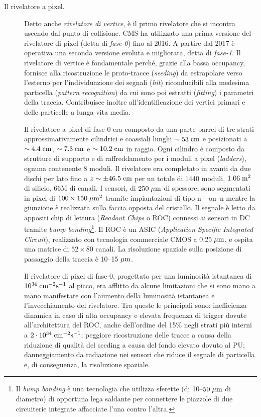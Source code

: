 \begin{description}

\item[Il rivelatore a pixel.] Detto anche {\em rivelatore di vertice}, \`e il primo rivelatore che si incontra uscendo dal punto di collisione. CMS ha utilizzato una prima versione del rivelatore di pixel (detta di {\em fase-0}) fino al 2016. A partire dal 2017 \`e operativa una seconda versione evoluta e migliorata, detta di {\em fase-1}. Il rivelatore di vertice \`e fondamentale perch\'e, grazie alla bassa occupancy, fornisce alla ricostruzione le proto-tracce ({\em seeding}) da estrapolare verso l'esterno per l'individuazione dei segnali ({\em hit}) riconducibili alla medesima particella ({\em pattern recognition}) da cui sono poi estratti ({\em fitting}) i parametri della traccia\cite{Chatrchyan:2014fea}. Contribuisce inoltre all'identificazione dei vertici primari e delle particelle a lunga vita media.
 
Il rivelatore a pixel di fase-0 era composto da una parte barrel di tre strati approssimativamente cilindrici e coassiali lunghi $\sim 53\rm \; cm$ e posizionati a $\sim 4.4\rm \; cm$, $\sim 7.3\rm \; cm$ e $\sim 10.2\rm \; cm$ in raggio. Ogni cilindro \`e composto da strutture di supporto e di raffreddamento per i moduli a pixel ({\em ladders}), ognuna contenente 8 moduli. Il rivelatore era completato in avanti da due dischi per lato fino a $z\sim\pm 46.5\rm \; cm$ per un totale di 1440 moduli, $1.06\rm \; m^2$ di silicio, 66M di canali. I sensori, di $250\; \mu \rm m$ di spessore, sono segmentati in pixel di $100\times150\; \mu \rm m^2$ tramite impiantazioni di tipo n$^+$--on--n mentre la giunzione \`e realizzata sulla faccia opposta del cristallo. Il segnale \`e letto da appositi chip di lettura ({\em Readout Chips} o ROC) connessi ai sensori in DC tramite {\em bump bonding}\footnote{Il {\em bump bonding} \`e una tecnologia che utilizza sferette (di 10--$50\; \mu \rm m$ di diametro) di opportuna lega saldante per connettere le piazzole di due circuiterie integrate affacciate l'una contro l'altra.}. Il ROC \`e un ASIC ({\em Application Specific Integrated Circuit}), realizzato con tecnologia commerciale CMOS a $0.25\; \mu \rm m$, e ospita una matrice di $52\times80$ canali. La risoluzione spaziale sulla posizione di passaggio della traccia \`e 10--15$\; \mu \rm m$.

Il rivelatore di pixel di fase-0, progettato per una luminosit\`a istantanea di $10^{34}\rm \; cm^{-2}{\mathrm s}^{-1}$ al picco, era afflitto da alcune limitazioni che si sono mano a mano manifestate con l'aumento della luminosit\`a istantanea e l'invecchiamento del rivelatore. Tra queste le principali sono: inefficienza dinamica in caso di alta occupancy e elevata frequenza di trigger dovute all'architettura del ROC, anche dell'ordine del 15\% negli strati pi\`u interni a $2\cdot10^{34}\rm \; cm^{-2}{\mathrm s}^{-1}$; peggiore ricostruzione delle tracce a causa della riduzione di qualit\`a del seeding a causa del fondo elevato dovuto al PU; danneggiamento da radiazione nei sensori che riduce il segnale di particella e, di conseguenza, la risoluzione spaziale.


\end{description}
